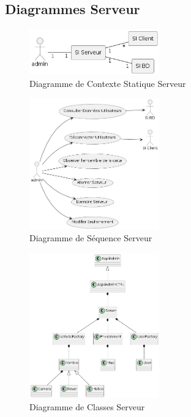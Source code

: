 \documentclass[12pt,a4paper]{scrartcl}
\begin{document}
\subsection{Diagrammes Serveur}
\begin{figure}[h]
    \centering
    \includegraphics[width=0.5\textwidth]{DiagCS_Admin.png}
    \caption{Diagramme de Contexte Statique Serveur}\label{cs_serv}
\end{figure}

\begin{figure}[h]
    \centering
    \includegraphics[width=0.5\textwidth]{Diag_Seq_Admin.png}
    \caption{Diagramme de Séquence Serveur}\label{seq_serv}
\end{figure}

\begin{figure}[h]
    \centering
    \includegraphics[width=0.5\textwidth]{Diag_Class_Admin.png}
    \caption{Diagramme de Classes Serveur}\label{seq_serv}
\end{figure}
\end{document}
